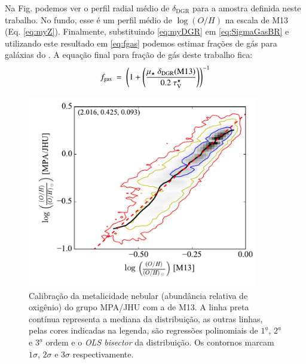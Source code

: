 Na Fig. \label{fig:DGR_R} podemos ver o perfil radial médio de $\delta_{\mathrm{DGR}}$ para a
amostra definida neste trabalho. No fundo, esse é um perfil médio de $\log (O/H)$ na escala de M13
(Eq. \ref{eq:myZ}). Finalmente, substituindo \eqref{eq:myDGR} em \eqref{eq:SigmaGasBR} e utilizando
este resultado em \eqref{eq:fgas} podemos estimar frações de gás para galáxias do \CAL. A equação
final para fração de gás deste trabalho fica:
\begin{equation}
	f_{\mathrm{gas}}\ =\ \left(1 + \left(\frac{\mu_\star\ \delta_{\mathrm{DGR}}(\mathrm{M13})}{0.2\ 
\tauVS}\right)\right)^{-1}
	\label{eq:fgasthiswork}
\end{equation}

\begin{figure}
	\centering
	\includegraphics[width=0.9\textwidth]{figuras/logOH_ZnebMPA.pdf}
	\caption[Calibração das metalicidades]
	{Calibração da metalicidade nebular (abundância relativa de oxigênio) do grupo MPA/JHU com a de
M13. A linha preta contínua representa a mediana da distribuição, as outras linhas, pelas cores
indicadas na legenda, são regressões polinomiais de $1^\underline{a}$, $2^\underline{a}$ e
$3^\underline{a}$ ordem e o {\em OLS bisector} da distribuição. Os contornos marcam $1\sigma$,
$2\sigma$ e $3\sigma$ respectivamente.}
	\label{fig:calibZ}
\end{figure}

